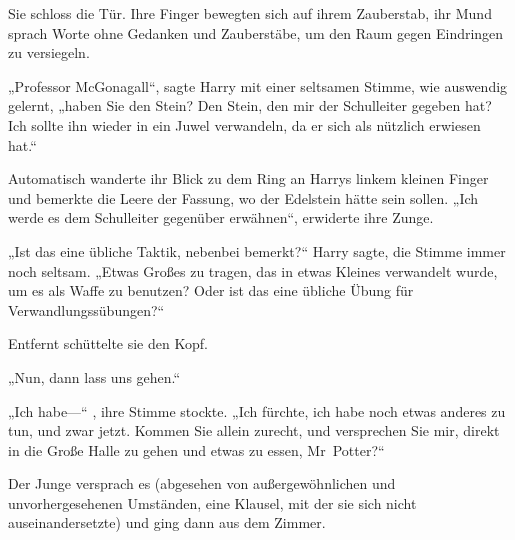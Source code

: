 
Sie schloss die Tür. Ihre Finger bewegten sich auf ihrem Zauberstab, ihr Mund sprach Worte ohne Gedanken und Zauberstäbe, um den Raum gegen Eindringen zu versiegeln.

„Professor McGonagall“, sagte Harry mit einer seltsamen Stimme, wie auswendig gelernt, „haben Sie den Stein? Den Stein, den mir der Schulleiter gegeben hat? Ich sollte ihn wieder in ein Juwel verwandeln, da er sich als nützlich erwiesen hat.“

Automatisch wanderte ihr Blick zu dem Ring an Harrys linkem kleinen Finger und bemerkte die Leere der Fassung, wo der Edelstein hätte sein sollen.
„Ich werde es dem Schulleiter gegenüber erwähnen“, erwiderte ihre Zunge.

„Ist das eine übliche Taktik, nebenbei bemerkt?“ Harry sagte, die Stimme immer noch seltsam. „Etwas Großes zu tragen, das in etwas Kleines verwandelt wurde, um es als Waffe zu benutzen? Oder ist das eine übliche Übung für Verwandlungssübungen?“

Entfernt schüttelte sie den Kopf.

„Nun, dann lass uns gehen.“

„Ich habe—“ , ihre Stimme stockte. „Ich fürchte, ich habe noch etwas anderes zu tun, und zwar jetzt. Kommen Sie allein zurecht, und versprechen Sie mir, direkt in die Große Halle zu gehen und etwas zu essen, Mr~Potter?“

Der Junge versprach es (abgesehen von außergewöhnlichen und unvorhergesehenen Umständen, eine Klausel, mit der sie sich nicht auseinandersetzte) und ging dann aus dem Zimmer.

